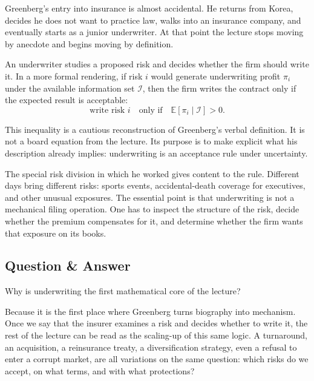 Greenberg's entry into insurance is almost accidental. He returns from Korea, decides he does not want to practice law, walks into an insurance company, and eventually starts as a junior underwriter. At that point the lecture stops moving by anecdote and begins moving by definition.

\begin{definition}
An underwriter studies a proposed risk and decides whether the firm should write it. In a more formal rendering, if risk \(i\) would generate underwriting profit \(\pi_i\) under the available information set \(\mathcal{I}\), then the firm writes the contract only if the expected result is acceptable:
\begin{equation}
\text{write risk } i \quad \text{only if} \quad \mathbb{E}[\pi_i \mid \mathcal{I}] > 0.
\end{equation}
\end{definition}

\begin{remark}
This inequality is a cautious reconstruction of Greenberg's verbal definition. It is not a board equation from the lecture. Its purpose is to make explicit what his description already implies: underwriting is an acceptance rule under uncertainty.
\end{remark}

The special risk division in which he worked gives content to the rule. Different days bring different risks: sports events, accidental-death coverage for executives, and other unusual exposures. The essential point is that underwriting is not a mechanical filing operation. One has to inspect the structure of the risk, decide whether the premium compensates for it, and determine whether the firm wants that exposure on its books.

\subsection{Question \& Answer}

Why is underwriting the first mathematical core of the lecture?

Because it is the first place where Greenberg turns biography into mechanism. Once we say that the insurer examines a risk and decides whether to write it, the rest of the lecture can be read as the scaling-up of this same logic. A turnaround, an acquisition, a reinsurance treaty, a diversification strategy, even a refusal to enter a corrupt market, are all variations on the same question: which risks do we accept, on what terms, and with what protections?


